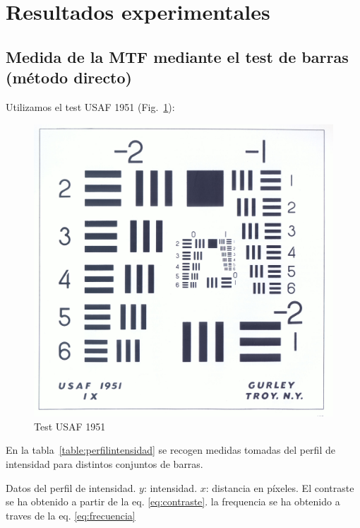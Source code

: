 \documentclass{./packages/optica-article}
\begin{document}
\section{Resultados experimentales}

\subsection{Medida de la MTF mediante el test de barras (método directo)}

Utilizamos el test USAF 1951 (Fig.~\ref{fig:usaf1951}):

\begin{figure}[htbp]
	\centering
	\includegraphics[scale=0.05]{testusaf1951}
	\caption{Test USAF 1951}\label{fig:usaf1951}
\end{figure}

En la tabla~\ref{table:perfilintensidad} se recogen medidas tomadas del perfil de intensidad para distintos conjuntos de barras.

\begin{table}[p]
	\centering
	\caption{Datos del perfil de intensidad. $y$: intensidad. $x$: distancia en píxeles. El contraste se ha obtenido a partir de la eq. \ref{eq:contraste}. la frequencia se ha obtenido a traves de la eq. \ref{eq:frecuencia}}%
	\label{table:perfilintensidad}
\end{table}
\end{document}
